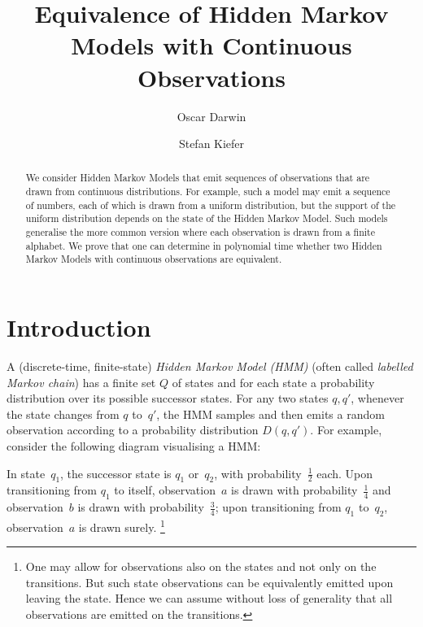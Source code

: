\documentclass[a4paper,UKenglish,cleveref, autoref,mathscr, amsthm, thmtools, thm-restate]{lipics-v2019}
\title{Equivalence of Hidden Markov Models with Continuous Observations}
\author{Oscar Darwin}{Department of Computer Science, Oxford University, United Kingdom }{}{https://orcid.org/0000-0001-5016-014X}{}%
\author{Stefan Kiefer}{Department of Computer Science, Oxford University, United Kingdom}{}{https://orcid.org/0000-0003-4173-6877}{}
\newcommand{\1}{\mathbb{I}}
\begin{document}
\maketitle

\begin{abstract}
We consider Hidden Markov Models that emit sequences of observations that are drawn from continuous distributions. For example, such a model may emit a sequence of numbers, each of which is drawn from a uniform distribution, but the support of the uniform distribution depends on the state of the Hidden Markov Model. Such models generalise the more common version where each observation is drawn from a finite alphabet. We prove that one can determine in polynomial time whether two Hidden Markov Models with continuous observations are equivalent.
\end{abstract}

\section{Introduction}

A (discrete-time, finite-state) \emph{Hidden Markov Model (HMM)} (often called \emph{labelled Markov chain}) has a finite set $Q$ of states and for each state a probability distribution over its possible successor states.
For any two states $q, q'$, whenever the state changes from $q$ to~$q'$, the HMM samples and then emits a random observation according to a probability distribution $D(q, q')$.
For example, consider the following diagram visualising a HMM:
\begin{center}
\end{center}
In state~$q_1$, the successor state is $q_1$ or~$q_2$, with probability~$\frac12$ each.
Upon transitioning from $q_1$ to itself, observation~$a$ is drawn with probability~$\frac14$ and observation~$b$ is drawn with probability~$\frac34$; upon transitioning from $q_1$ to~$q_2$, observation~$a$ is drawn surely.%
\footnote{One may allow for observations also on the states and not only on the transitions. But such state observations can be equivalently emitted upon leaving the state. Hence we can assume without loss of generality that all observations are emitted on the transitions.}
\end{document}
